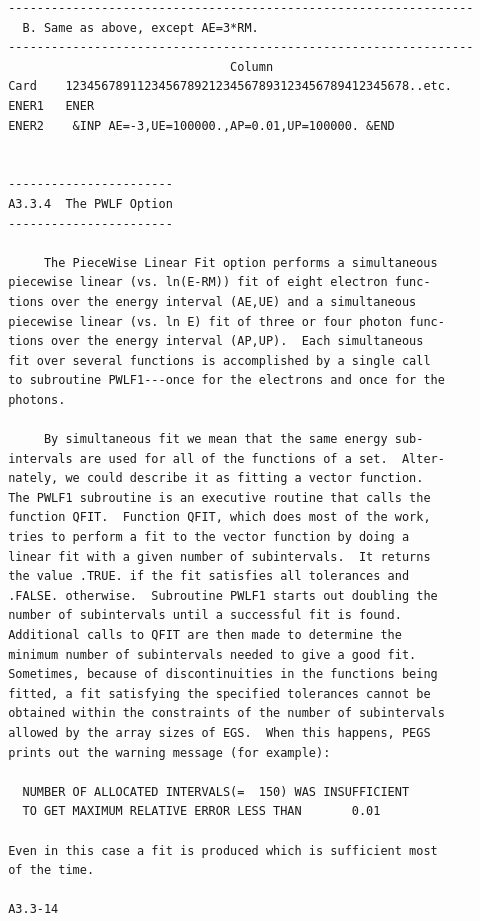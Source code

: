 \newpage {} \begin{verbatim}
 -----------------------------------------------------------------
   B. Same as above, except AE=3*RM.
 -----------------------------------------------------------------
                                Column
 Card    123456789112345678921234567893123456789412345678..etc.
 ENER1   ENER
 ENER2    &INP AE=-3,UE=100000.,AP=0.01,UP=100000. &END


 -----------------------
 A3.3.4  The PWLF Option
 -----------------------

      The PieceWise Linear Fit option performs a simultaneous
 piecewise linear (vs. ln(E-RM)) fit of eight electron func-
 tions over the energy interval (AE,UE) and a simultaneous
 piecewise linear (vs. ln E) fit of three or four photon func-
 tions over the energy interval (AP,UP).  Each simultaneous
 fit over several functions is accomplished by a single call
 to subroutine PWLF1---once for the electrons and once for the
 photons.

      By simultaneous fit we mean that the same energy sub-
 intervals are used for all of the functions of a set.  Alter-
 nately, we could describe it as fitting a vector function.
 The PWLF1 subroutine is an executive routine that calls the
 function QFIT.  Function QFIT, which does most of the work,
 tries to perform a fit to the vector function by doing a
 linear fit with a given number of subintervals.  It returns
 the value .TRUE. if the fit satisfies all tolerances and
 .FALSE. otherwise.  Subroutine PWLF1 starts out doubling the
 number of subintervals until a successful fit is found.
 Additional calls to QFIT are then made to determine the
 minimum number of subintervals needed to give a good fit.
 Sometimes, because of discontinuities in the functions being
 fitted, a fit satisfying the specified tolerances cannot be
 obtained within the constraints of the number of subintervals
 allowed by the array sizes of EGS.  When this happens, PEGS
 prints out the warning message (for example):

   NUMBER OF ALLOCATED INTERVALS(=  150) WAS INSUFFICIENT
   TO GET MAXIMUM RELATIVE ERROR LESS THAN       0.01

 Even in this case a fit is produced which is sufficient most
 of the time.

 A3.3-14
\end{verbatim}
